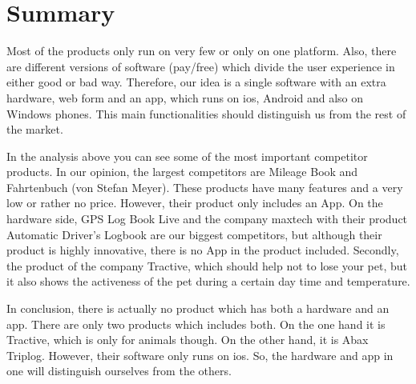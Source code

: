 \section{Summary}
Most of the products only run on very few or only on one platform. Also, there are different versions of software (pay/free) which divide the user experience in either good or bad way. Therefore, our idea is a single software with an extra hardware, web form and an app, which runs on \gls{ios}, Android and also on Windows phones. This main functionalities should distinguish us from the rest of the market. 

In the analysis above you can see some of the most important competitor products. In our opinion, the largest competitors are Mileage Book and Fahrtenbuch (von Stefan Meyer). These products have many features and a very low or rather no price. However, their product only includes an App.
On the hardware side, GPS Log Book Live and the company maxtech with their product Automatic Driver’s Logbook are our biggest competitors, but although their product is highly innovative, there is no App in the product included. Secondly, the product of the company Tractive, which should help not to lose your pet, but it also shows the activeness of the pet during a certain day time and temperature.

In conclusion, there is actually no product which has both a hardware and an app. There are only two products which includes both. On the one hand it is Tractive, which is only for animals though. On the other hand, it is Abax Triplog. However, their software only runs on \gls{ios}. So, the hardware and app in one will distinguish ourselves from the others.
\newline\newline

